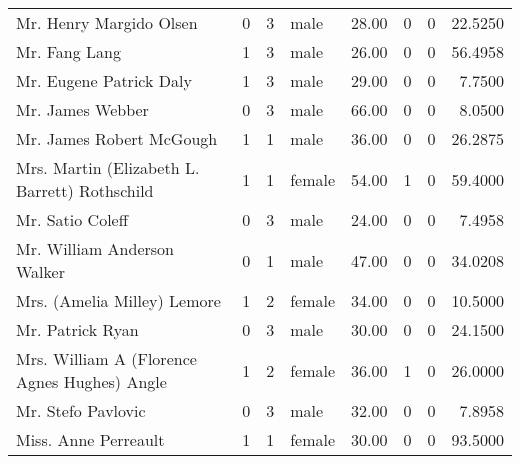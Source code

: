 \begin{tabular}{lrrlrrrr}
Mr. Henry Margido Olsen                            &         0 &       3 &    male &  28.00 &                        0 &                        0 &   22.5250 \\
Mr. Fang Lang                                      &         1 &       3 &    male &  26.00 &                        0 &                        0 &   56.4958 \\
Mr. Eugene Patrick Daly                            &         1 &       3 &    male &  29.00 &                        0 &                        0 &    7.7500 \\
Mr. James Webber                                   &         0 &       3 &    male &  66.00 &                        0 &                        0 &    8.0500 \\
Mr. James Robert McGough                           &         1 &       1 &    male &  36.00 &                        0 &                        0 &   26.2875 \\
Mrs. Martin (Elizabeth L. Barrett) Rothschild      &         1 &       1 &  female &  54.00 &                        1 &                        0 &   59.4000 \\
Mr. Satio Coleff                                   &         0 &       3 &    male &  24.00 &                        0 &                        0 &    7.4958 \\
Mr. William Anderson Walker                        &         0 &       1 &    male &  47.00 &                        0 &                        0 &   34.0208 \\
Mrs. (Amelia Milley) Lemore                        &         1 &       2 &  female &  34.00 &                        0 &                        0 &   10.5000 \\
Mr. Patrick Ryan                                   &         0 &       3 &    male &  30.00 &                        0 &                        0 &   24.1500 \\
Mrs. William A (Florence Agnes Hughes) Angle       &         1 &       2 &  female &  36.00 &                        1 &                        0 &   26.0000 \\
Mr. Stefo Pavlovic                                 &         0 &       3 &    male &  32.00 &                        0 &                        0 &    7.8958 \\
Miss. Anne Perreault                               &         1 &       1 &  female &  30.00 &                        0 &                        0 &   93.5000 \\

\end{tabular}
